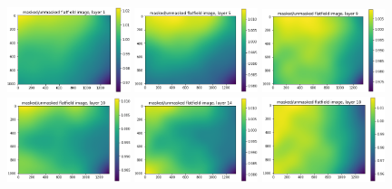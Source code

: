 \documentclass[letterpaper,11pt]{article}
\begin{document}
\begin{figure}[!ht]
\centering
\includegraphics[width=0.32\textwidth]{images/results/masked_over_unmasked_flatfield_image_layers/masked_over_unmasked_flatfield_image_layer_1}
\includegraphics[width=0.32\textwidth]{images/results/masked_over_unmasked_flatfield_image_layers/masked_over_unmasked_flatfield_image_layer_5}
\includegraphics[width=0.32\textwidth]{images/results/masked_over_unmasked_flatfield_image_layers/masked_over_unmasked_flatfield_image_layer_9}
\includegraphics[width=0.32\textwidth]{images/results/masked_over_unmasked_flatfield_image_layers/masked_over_unmasked_flatfield_image_layer_10}
\includegraphics[width=0.32\textwidth]{images/results/masked_over_unmasked_flatfield_image_layers/masked_over_unmasked_flatfield_image_layer_14}
\includegraphics[width=0.32\textwidth]{images/results/masked_over_unmasked_flatfield_image_layers/masked_over_unmasked_flatfield_image_layer_18}

\end{figure}
\end{document}
